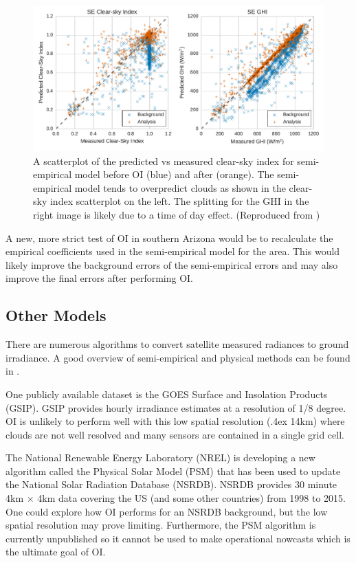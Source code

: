 \begin{figure}[h]
\centering
\includegraphics[width=\textwidth]{figs/suny_scatter.pdf}
\caption[Scatterplot of predicted vs measured clear-sky index for the
semi-empirical model]{A scatterplot of the predicted vs measured
  clear-sky index for semi-empirical model before OI (blue) and after
  (orange). The semi-empirical model tends to overpredict clouds as
  shown in the clear-sky index scatterplot on the left. The splitting
  for the GHI in the right image is likely due to a time of day
  effect.  (Reproduced from \cite{Lorenzo2017})}
\label{fig:suny_scatter}
\end{figure}

A new, more strict test of OI in southern Arizona would be to
recalculate the empirical coefficients used in the semi-empirical
model for the area.
This would likely improve the background errors of the semi-empirical
errors and may also improve the final errors after performing OI.

\subsection{Other Models}
There are numerous algorithms to convert satellite measured radiances
to ground irradiance.
A good overview of semi-empirical and physical methods can be found in
\cite{Perez2013a,Miller2013}.

One publicly available dataset is the GOES Surface and Insolation
Products (GSIP).
GSIP provides hourly irradiance estimates at a resolution of 1/8
degree.
OI is unlikely to perform well with this low spatial resolution
({\raise.4ex \hbox{\texttildelow}}14km) where clouds are not well
resolved and many sensors are contained in a single grid cell.

The National Renewable Energy Laboratory (NREL) is developing a new
algorithm called the Physical Solar Model (PSM) that has been used to update
the National Solar Radiation Database (NSRDB).
NSRDB provides 30 minute 4km $\times$ 4km data covering the US (and
some other countries) from 1998 to 2015.
One could explore how OI performs for an NSRDB background, but the low
spatial resolution may prove limiting.
Furthermore, the PSM algorithm is currently unpublished so it cannot
be used to make operational nowcasts which is the ultimate goal of OI.


